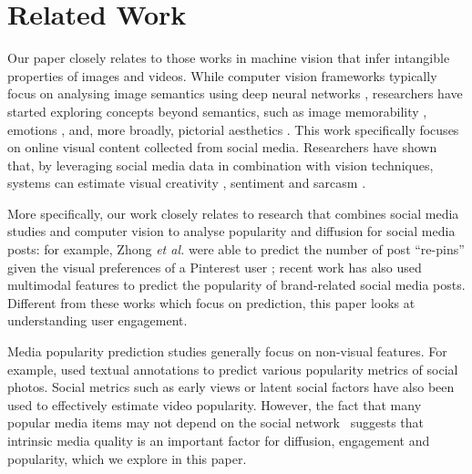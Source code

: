 \section{ Related Work}
Our paper closely relates to those works  in machine vision that infer intangible properties of images and videos. While  computer vision frameworks typically focus on analysing image semantics using deep neural networks \cite{krizhevsky2012imagenet}, researchers have started exploring concepts beyond semantics, such as image memorability \cite{isola2011makes}, emotions \cite{Machajdik}, and, more broadly, pictorial aesthetics \cite{datta2008algorithmic,luo2008photo,goodSelfie}. 
This work specifically focuses on online visual content collected from social media. Researchers have shown that, by leveraging social media data in combination with vision techniques, systems can estimate visual creativity \cite{redi20146},  sentiment \cite{wang2015inferring,jou2015visual} and sarcasm \cite{schifanella2016detecting}. %

More specifically, our work closely relates to research that combines social media studies and computer vision to analyse popularity and diffusion for social media posts: for example, Zhong \textsl{et al.} were able to predict the number of post ``re-pins''  given the visual preferences of a Pinterest user \cite{predictingPintrest}; recent work \cite{Mazloom:2016:MPP:2964284.2967210} has also used multimodal features to predict the popularity of brand-related social media posts. Different from these works which focus on prediction,  this paper looks at understanding user engagement. 

Media popularity prediction studies generally focus on non-visual features.  For example, \cite{Yamasaki:2014} used textual annotations to predict various popularity metrics of social photos. Social metrics such as early views \cite{pinto2013using} or latent social factors \cite{nwana2013latent} have also been used to effectively estimate video popularity. However, the fact that many popular media items may not depend on the social  network~\cite{Cha2009Flickr} suggests that intrinsic media quality is an important factor for diffusion, engagement and popularity, which we explore in this paper.
 

